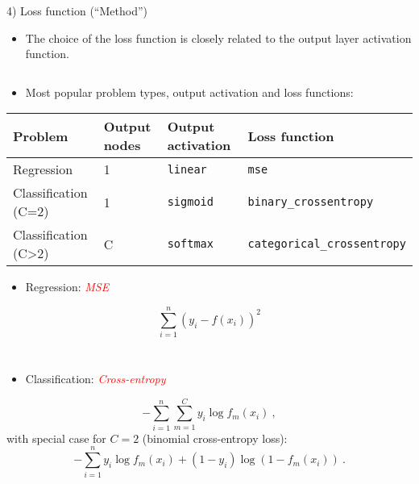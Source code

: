 \documentclass[
  10pt,
  ignorenonframetext,
]{beamer}
\providecommand{\tightlist}{%
  \setlength{\itemsep}{0pt}\setlength{\parskip}{0pt}}
\begin{document}
\begin{frame}[fragile]
\begin{block}{4) Loss function (``Method'')}
\protect\hypertarget{loss-function-method}{}
\(~\)

\begin{itemize}
\tightlist
\item
  The choice of the loss function is closely related to the output layer
  activation function.
\end{itemize}

\(~\)

\begin{itemize}
\tightlist
\item
  Most popular problem types, output activation and loss functions:
\end{itemize}

\scriptsize

\begin{longtable}[]{@{}llll@{}}
\toprule()
Problem & Output nodes & Output activation & Loss function \\
\midrule()
\endhead
Regression & 1 & \texttt{linear} & \texttt{mse} \\
Classification (C=2) & 1 & \texttt{sigmoid} &
\texttt{binary\_crossentropy} \\
Classification (C\textgreater2) & C & \texttt{softmax} &
\texttt{categorical\_crossentropy} \\
\bottomrule()
\end{longtable}
\end{block}
\end{frame}

\begin{frame}
\begin{itemize}
\tightlist
\item
  Regression: \emph{\textcolor{red}{MSE}}
\end{itemize}

\[\sum_{i=1}^n (y_i- f(x_i))^2\]

\(~\)

\(~\)

\begin{itemize}
\tightlist
\item
  Classification: \emph{\textcolor{red}{Cross-entropy}}
\end{itemize}

\[-\sum_{i=1}^n \sum_{m=1}^C y_i \log f_m(x_i) \ ,\] with special case
for \(C=2\) (binomial cross-entropy loss):
\[-\sum_{i=1}^n  y_i \log f_m(x_i) + (1-y_i) \log (1-f_m(x_i)) \ .\]
\end{frame}
\end{document}
